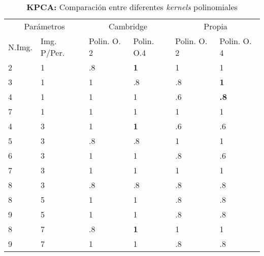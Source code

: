 \documentclass[12pt, twocolumn]{article}
\begin{document}
	
	\begin{table*}[]
		\centering
		\begin{tabular}{@{}ll|ll|ll@{}}
			\multicolumn{2}{c}{Parámetros} & \multicolumn{2}{c|}{Cambridge}                & \multicolumn{2}{c}{Propia}                    \\
			N.Img.      & Img. P/Per.      & \multicolumn{1}{l|}{Polin. O. 2} & Polin. O.4 & \multicolumn{1}{l|}{Polin. O. 2} & Polin. O. 4 \\ \midrule
			2           & 1                & .8                               & \textbf{1} & 1                                & 1           \\
			3           & 1                & 1                                & .8         & .8                               & \textbf{1}  \\
			4           & 1                & 1                                & 1          & .6                               & \textbf{.8} \\
			7           & 1                & 1                                & 1          & 1                                & 1           \\
			4           & 3                & 1                                & \textbf{1} & .6                               & .6          \\
			5           & 3                & .8                               & .8         & 1                                & 1           \\
			6           & 3                & 1                                & 1          & .8                               & .6    \\
			7           & 3                & 1                                & 1          & 1                                & 1           \\
			8           & 3                & .8                               & .8         & .8                               & .8          \\
			8           & 5                & 1                                & 1          & .8                               & .8          \\
			9           & 5                & 1                                & 1          & .8                               & .8          \\
			8           & 7                & .8                               & \textbf{1} & 1                                & 1           \\
			9           & 7                & 1                                & 1          & .8                               & .8         
		\end{tabular}
		\caption{\textbf{KPCA:} Comparación entre diferentes \textit{kernels} polinomiales}
		\label{kpca}
	\end{table*}
	
\end{document}
